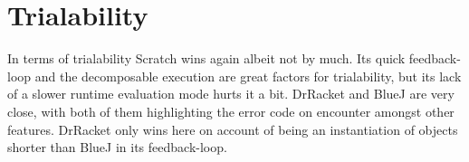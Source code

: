 \section{Trialability}
\label{sec:trialability}
In terms of trialability Scratch wins again albeit not by much.
Its quick feedback-loop and the decomposable execution are great factors for trialability, but its lack of a slower runtime evaluation mode hurts it a bit.
DrRacket and BlueJ are very close, with both of them highlighting the error code on encounter amongst other features.
DrRacket only wins here on account of being an instantiation of objects shorter than BlueJ in its feedback-loop.